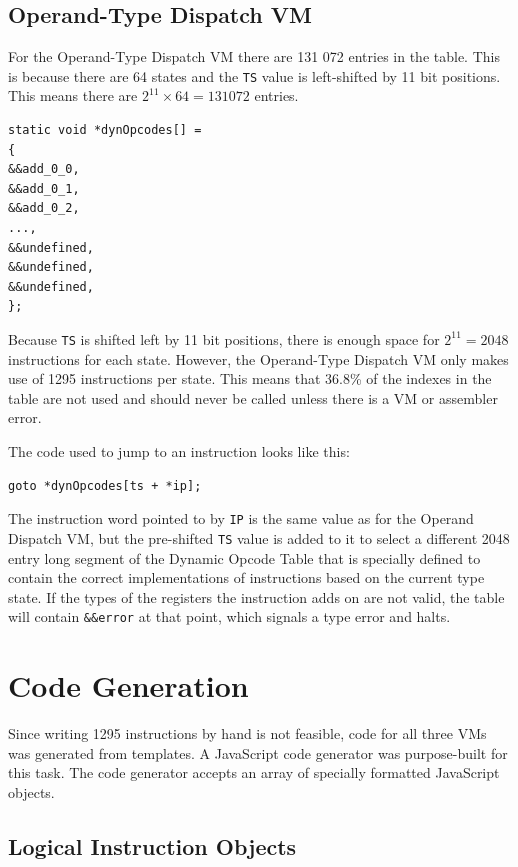 \documentclass[english,a4paper,12pt]{report}
\begin{document}
\subsection{Operand-Type Dispatch VM}
\label{sec:operand-type-dispatch-dispatch}
For the Operand-Type Dispatch VM there are 131 072 entries in the
table. This is because there are 64 states and the \verb|TS| value is
left-shifted by 11 bit positions. This means there are
$2^{11} \times 64 = 131 072$ entries.
\begin{lstlisting}
static void *dynOpcodes[] = 
{
&&add_0_0,
&&add_0_1,
&&add_0_2,
...,
&&undefined,
&&undefined,
&&undefined,	
};	
\end{lstlisting}

Because \verb|TS| is shifted left by 11 bit positions, there is enough
space for $2^{11} = 2048$ instructions for each state. However, the
Operand-Type Dispatch VM only makes use of 1295 instructions per
state. This means that 36.8\% of the indexes in the table are not used
and should never be called unless there is a VM or assembler error.

The code used to jump to an instruction looks like this:
\begin{lstlisting}
goto *dynOpcodes[ts + *ip];
\end{lstlisting}

The instruction word pointed to by \verb|IP| is the same value as for
the Operand Dispatch VM, but the pre-shifted \verb|TS| value is added
to it to select a different 2048 entry long segment of the Dynamic
Opcode Table that is specially defined to contain the correct
implementations of instructions based on the current type state. If
the types of the registers the instruction adds on are not valid, the
table will contain \verb|&&error| at that point, which signals a type
error and halts.

\section{Code Generation}

Since writing 1295 instructions by hand is not feasible, code for all
three VMs was generated from templates. A JavaScript code generator
was purpose-built for this task. The code generator accepts an array
of specially formatted JavaScript objects.

\subsection{Logical Instruction Objects}
\end{document}
